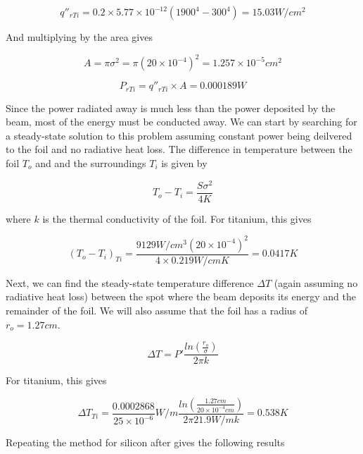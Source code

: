 \documentclass[12pt]{article}
\begin{document}
\begin{equation}
q''_{r Ti}=0.2 \times 5.77 \times 10^{-12} (1900^{4}-300^{4})=15.03 W/cm^2
\end{equation}

And multiplying by the area gives

\begin{equation}
A=\pi \sigma^{2}=\pi (20 \times 10^{-4})^2=1.257 \times 10^{-5} cm^2
\end{equation}

\begin{equation}
P_{r Ti}=q''_{r Ti} \times A=0.000189 W
\end{equation}

Since the power radiated away is much less than the power deposited by the beam, most of the energy must be conducted away. We can start by searching for a steady-state solution to this problem assuming constant power being deilvered to the foil and no radiative heat loss. The difference in temperature between the foil $T_o$ and and the surroundings $T_i$ is given by

\begin{equation}
T_o-T_i=\frac{S \sigma^{2}}{4 K}
\end{equation}

where $k$ is the thermal conductivity of the foil. For titanium, this gives

\begin{equation}
(T_o-T_i)_{Ti}=\frac{9129 W/cm^3 (20 \times 10^{-4})^{2}}{4 \times 0.219 W/cm K}=0.0417 K
\end{equation}

Next, we can find the steady-state temperature difference $\Delta T$ (again assuming no radiative heat loss) between the spot where the beam deposits its energy and the remainder of the foil. We will also assume that the foil has a radius of $r_o=1.27 cm$. 

\begin{equation}
\Delta T=P' \frac{ln(\frac{r_o}{\sigma})}{2 \pi k}
\end{equation}

For titanium, this gives

\begin{equation}
\Delta T_{Ti}=\frac{0.0002868}{25 \times 10^{-6}} W/m \frac{ln(\frac{1.27 cm}{20 \times 10^{-4} cm})}{2 \pi 21.9 W/mk}=0.538 K
\end{equation}

Repeating the method for silicon after gives the following results
\end{document}
